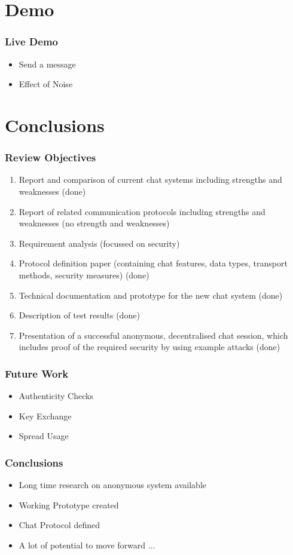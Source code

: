 \documentclass{beamer}
\begin{document}
\section{Demo}
\frame
{
  \frametitle{Live Demo}
  \begin{itemize}
    \item Send a message
    \item Effect of Noise
  \end{itemize}
}


\section{Conclusions}
\frame
{
  \frametitle{Review Objectives}
\begin{tiny}
\begin{enumerate}
\item Report and comparison of current chat systems including strengths and weaknesses (\alert{done})
\item Report of related communication protocols including strengths and weaknesses (\alert{no strength and weaknesses})
\item Requirement analysis (\alert{focussed on security})
\item Protocol definition paper (containing chat features, data types, transport methods, security measures) (\alert{done})
\item Technical documentation and prototype for the new chat system (\alert{done})
\item Description of test results (\alert{done})
\item Presentation of a successful anonymous, decentralised chat session, which includes proof of the required security by using example attacks (\alert{done})
\end{enumerate}
\end{tiny}

}

\frame
{
  \frametitle{Future Work}
  \begin{itemize}
    \item Authenticity Checks
    \item Key Exchange
    \item Spread Usage
  \end{itemize}
}

\frame
{
  \frametitle{Conclusions}
  \begin{itemize}
    \item Long time research on anonymous system available
    \item Working Prototype created
    \item Chat Protocol defined
    \item A lot of potential to move forward ...
  \end{itemize}
}
\end{document}
